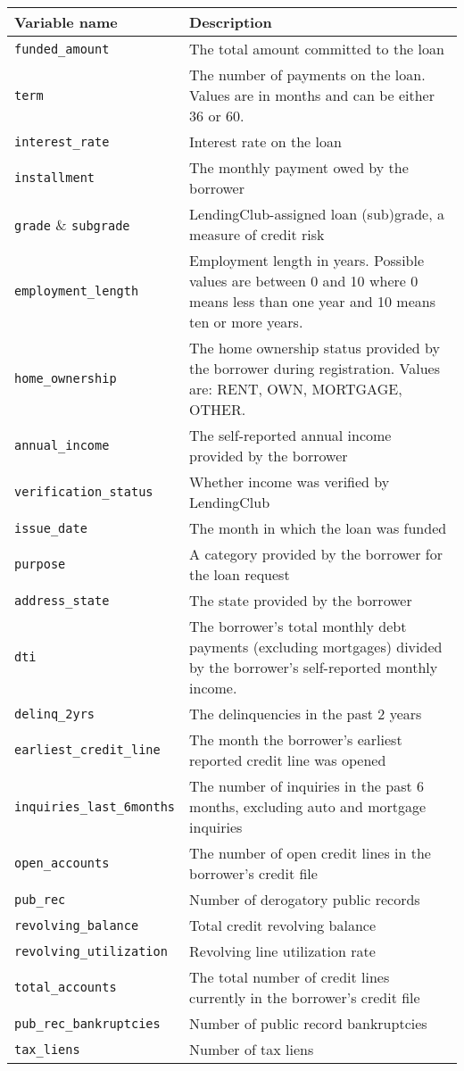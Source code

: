 \begin{table}[!ht]
\footnotesize
\centering

\begin{tabular}{p{5cm}p{10cm}}
\toprule
\textbf{Variable name} & \textbf{Description} \\ \midrule
\texttt{funded\_amount} & The total amount committed to the loan \\
\texttt{term} & The number of payments on the loan. Values are in months and can be either 36 or 60. \\
\texttt{interest\_rate} & Interest rate on the loan \\
\texttt{installment} & The monthly payment owed by the borrower \\
\texttt{grade} \& \texttt{subgrade} & LendingClub-assigned loan (sub)grade, a measure of credit risk \\
\texttt{employment\_length} & Employment length in years. Possible values are between 0 and 10 where 0 means less than one year and 10 means ten or more years. \\
\texttt{home\_ownership} & The home ownership status provided by the borrower during registration. Values are: RENT, OWN, MORTGAGE, OTHER. \\
\texttt{annual\_income} & The self-reported annual income provided by the borrower \\ 
\texttt{verification\_status} & Whether income was verified by LendingClub \\
\texttt{issue\_date} & The month in which the loan was funded \\
\texttt{purpose} & A category provided by the borrower for the loan request \\
\texttt{address\_state} & The state provided by the borrower \\
\texttt{dti} & The borrower's total monthly debt payments (excluding mortgages) divided by the borrower's self-reported monthly income. \\
\texttt{delinq\_2yrs} & The delinquencies in the past 2 years \\
\texttt{earliest\_credit\_line} & The month the borrower's earliest reported credit line was opened \\
\texttt{inquiries\_last\_6months} & The number of inquiries in the past 6 months, excluding auto and mortgage inquiries \\
\texttt{open\_accounts} & The number of open credit lines in the borrower's credit file \\
\texttt{pub\_rec} & Number of derogatory public records \\
\texttt{revolving\_balance} & Total credit revolving balance \\
\texttt{revolving\_utilization} & Revolving line utilization rate \\
\texttt{total\_accounts} & The total number of credit lines currently in the borrower's credit file \\
\texttt{pub\_rec\_bankruptcies} & Number of public record bankruptcies \\
\texttt{tax\_liens} & Number of tax liens \\


\end{tabular}
\end{table}
